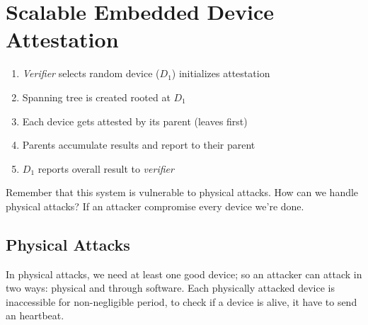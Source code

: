 \section{Scalable Embedded Device Attestation}

\begin{enumerate}
	\item \textit{Verifier} selects random device ($D_1$) initializes attestation
	\item Spanning tree is created rooted at $D_1$
	\item Each device gets attested by its parent (leaves first)
	\item Parents accumulate results and report to their parent
	\item $D_1$ reports overall result to \textit{verifier}
\end{enumerate}

Remember that this system is vulnerable to physical attacks. How can we handle 
physical attacks? If an attacker compromise every device we're done.

\subsection{Physical Attacks}
In physical attacks, we need at least one good device; so an attacker can 
attack in two ways: physical and through software.
Each physically attacked device is inaccessible for non-negligible period, to 
check if a device is alive, it have to send an heartbeat.
